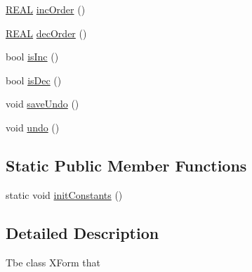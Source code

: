 \begin{DoxyCompactItemize}
\item 
\hyperlink{util_8h_a5821460e95a0800cf9f24c38915cbbde}{R\-E\-A\-L} \hyperlink{classCXForm_a094937703c2d67ef29f5c12fbc65b438}{inc\-Order} ()
\item 
\hyperlink{util_8h_a5821460e95a0800cf9f24c38915cbbde}{R\-E\-A\-L} \hyperlink{classCXForm_a903c633f1ac0756230bcd383e35a1d85}{dec\-Order} ()
\item 
bool \hyperlink{classCXForm_a9b085759beff4d834e56969eb01b7020}{is\-Inc} ()
\item 
bool \hyperlink{classCXForm_a14ededb4bf28f12d9f6525fa5758102d}{is\-Dec} ()
\item 
void \hyperlink{classCXForm_a706bcfdd32f029320524aaa7cbb1427e}{save\-Undo} ()
\item 
void \hyperlink{classCXForm_af7feb93ddf2cd2df187b35b565658d3d}{undo} ()
\end{DoxyCompactItemize}
\subsection*{Static Public Member Functions}
\begin{DoxyCompactItemize}
\item 
static void \hyperlink{classCXForm_a69329814cc3fdf98afabaebb57305886}{init\-Constants} ()
\end{DoxyCompactItemize}


\subsection{Detailed Description}
Tbe class X\-Form that 

